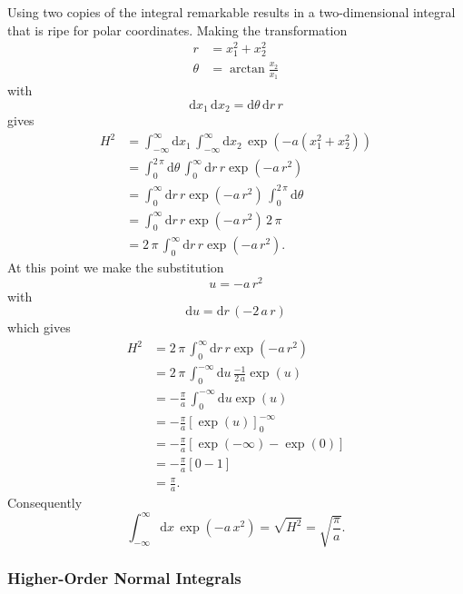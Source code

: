 \documentclass[
  letterpaper,
  DIV=11,
  numbers=noendperiod]{scrartcl}
\begin{document}
Using two copies of the integral remarkable results in a two-dimensional
integral that is ripe for polar coordinates. Making the transformation
\begin{align*}
r &= x_{1}^{2} + x_{2}^{2}
\\
\theta &= \arctan \frac{x_{2}}{x_{1}}
\end{align*} with \[
\mathrm{d} x_{1} \, \mathrm{d} x_{2} =
\mathrm{d} \theta \, \mathrm{d} r \, r
\] gives \begin{align*}
H^{2}
&=
\int_{-\infty}^{\infty} \mathrm{d} x_{1} \,
\int_{-\infty}^{\infty} \mathrm{d} x_{2} \,
\exp \left( -a \left( x_{1}^{2} + x_{2}^{2} \right) \right)
\\
&=
\int_{0}^{2 \, \pi} \mathrm{d} \theta \,
\int_{0}^{\infty} \mathrm{d} r \, r
\exp \left( -a \, r^{2} \right)
\\
&=
\int_{0}^{\infty} \mathrm{d} r \, r
\exp \left( -a \, r^{2} \right) \,
\int_{0}^{2 \, \pi} \mathrm{d} \theta
\\
&=
\int_{0}^{\infty} \mathrm{d} r \, r
\exp \left( -a \, r^{2} \right) \, 2 \, \pi
\\
&=
2 \, \pi \, \int_{0}^{\infty} \mathrm{d} r \, r
\exp \left( -a \, r^{2} \right).
\end{align*} At this point we make the substitution \[
u = - a \, r^{2}
\] with \[
\mathrm{d} u = \mathrm{d} r \, (- 2 \, a \, r )
\] which gives \begin{align*}
H^{2}
&=
2 \, \pi \, \int_{0}^{\infty} \mathrm{d} r \, r
\exp \left( -a \, r^{2} \right)
\\
&=
2 \, \pi \, \int_{0}^{-\infty} \mathrm{d} u \, \frac{-1}{2 \, a}
\exp \left( u \right)
\\
&=
- \frac{\pi}{a} \, \int_{0}^{-\infty} \mathrm{d} u \exp \left( u \right)
\\
&=
- \frac{\pi}{a} \left[ \exp \left( u \right) \right]_{0}^{-\infty}
\\
&=
- \frac{\pi}{a} \left[ \exp \left( -\infty \right) - \exp \left( 0 \right) \right]
\\
&=
- \frac{\pi}{a} \left[ 0 - 1 \right]
\\
&=
\frac{\pi}{a}.
\end{align*} Consequently \[
\int_{-\infty}^{\infty} \mathrm{d} x \, \exp \left( -a \, x^{2} \right)
=
\sqrt{H^{2}}
=
\sqrt{ \frac{\pi}{a} }.
\]

\hypertarget{higher-order-normal-integrals}{%
\subsubsection{Higher-Order Normal
Integrals}\label{higher-order-normal-integrals}}
\end{document}
